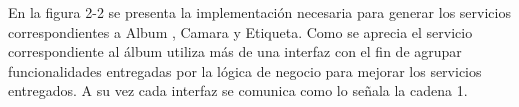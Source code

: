 \documentclass{memoria}
\begin{document}

En la figura 2-2 se presenta la implementación necesaria para generar los servicios correspondientes a Album , Camara y Etiqueta. Como se aprecia el servicio correspondiente al álbum utiliza más de una interfaz con el fin de agrupar funcionalidades entregadas por la lógica de negocio para mejorar los servicios entregados. A su vez cada interfaz se comunica como lo señala la cadena 1.


\end{document}
